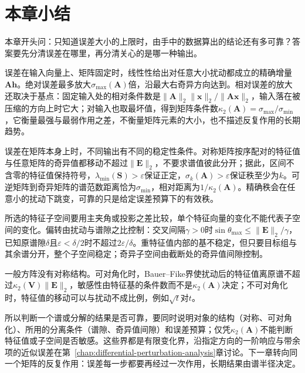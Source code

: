 \FloatBarrier
\section{本章小结}
\label{sec:condition-perturbation-summary}

本章开头问：只知道误差大小的上限时，由手中的数据算出的结论还有多可靠？答案要先分清误差在哪里，再分清关心的是哪一种输出。

误差在输入向量上、矩阵固定时，线性性给出对任意大小扰动都成立的精确增量$\bm A\bm h$。绝对误差最多放大$\sigma_{\max}(\bm A)$倍，沿最大右奇异方向达到。相对误差的放大还取决于基点：固定输入处的相对条件数是$\lVert\bm A\rVert_2\lVert\bm x\rVert_2/\lVert\bm A\bm x\rVert_2$，输入落在被压缩的方向上时它大；对输入也取最坏值，得到矩阵条件数$\kappa_2(\bm A)=\sigma_{\max}/\sigma_{\min}$，它衡量最强与最弱作用之差，不衡量矩阵元素的大小，也不描述反复作用的长期趋势。

误差在矩阵本身上时，不同输出有不同的稳定性条件。对称矩阵按序配对的特征值与任意矩阵的奇异值都移动不超过$\lVert\bm E\rVert_2$，不要求谱值彼此分开；据此，区间不含零的特征值保持符号，$\lambda_{\min}(\bm S)>\varepsilon$保证正定，$\sigma_k(\bm A)>\varepsilon$保证秩至少为$k$。可逆矩阵到奇异矩阵的谱范数距离恰为$\sigma_{\min}$，相对距离为$1/\kappa_2(\bm A)$。精确秩会在任意小的扰动下跳变，可靠的只是给定误差预算下的有效秩。

所选的特征子空间要用主夹角或投影之差比较，单个特征向量的变化不能代表子空间的变化。偏转由扰动与谱隙之比控制：交叉间隔$\gamma>0$时$\sin\theta_{\max}\leq\lVert\bm E\rVert_2/\gamma$，已知原谱隙$\delta$且$\varepsilon<\delta/2$时不超过$2\varepsilon/\delta$。重特征值内部的基不稳定，但只要目标组与其余谱分开，整个子空间稳定；奇异子空间由截断处的奇异值间隙控制。

一般方阵没有对称结构。可对角化时，Bauer--Fike界使扰动后的特征值离原谱不超过$\kappa_2(\bm V)\lVert\bm E\rVert_2$，敏感性由特征基的条件数而不是$\kappa_2(\bm A)$决定；不可对角化时，特征值的移动可以与扰动不成比例，例如$\sqrt t$对$t$。

所以判断一个谱或分解的结果是否可靠，要同时说明对象的结构（对称、可对角化）、所用的分离条件（谱隙、奇异值间隙）和误差预算；仅凭$\kappa_2(\bm A)$不能判断特征值或子空间是否敏感。这些界都是有限变化界，沿指定方向的一阶响应与带余项的近似误差在第~\ref{chap:differential-perturbation-analysis}章讨论。下一章转向同一个矩阵的反复作用：误差每一步都要再经过一次作用，长期结果由谱半径决定。
